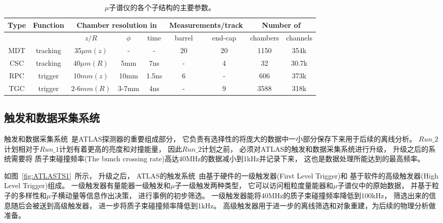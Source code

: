 \begin{table}[htbp]
      \caption{
$\mu$子谱仪的各个子结构的主要参数。    
      }
      \label{tab:ATLASTab2}
      \centering
      \begin{adjustbox}{width=\columnwidth,center}
      \begin{tabular}{|c|c|c|c|c|c|c|c|c|}
        \hline
         Type & Function  &   \multicolumn{3}{c|}{Chamber resolution in}   &   \multicolumn{2}{c}{Measurements/track}   &   \multicolumn{2}{|c|}{Number of}  \\
         \hline
         &   &  $z/R$ & $\phi$  & time  & barrel  & end-cap  &  chambers &   channels \\
         \hline
         MDT& tracking  & 35$\mu m(z)$ & -  &  - & 20  &  20 & 1150  &  354k \\
         \hline
         CSC& tracking  & 40$\mu m(R)$  &  5mm &  7ns &  - &  4 & 32  & 30.7k  \\
         \hline
         RPC& trigger  &  10$mm(z)$ & 10mm  & 1.5ns  &  6 & -  & 606  &  373k \\
         \hline
         TGC& trigger  & 2-6$mm(R)$  & 3-7mm  & 4ns  &  - & 9  & 3588  &  318k \\
         \hline
      \end{tabular}
      \end{adjustbox}
\end{table}

\subsection{触发和数据采集系统}
\label{sec:ATLASTDAS}

触发和数据采集系统~\cite{ATLASTDAQ}是ATLAS探测器的重要组成部分，
它负责有选择性的将庞大的数据中一小部分保存下来用于后续的离线分析。
$Run\_2$计划相对于$Run\_1$计划有着更高的亮度和对撞能量，
因此$Run\_2$计划之前，
必须对ATLAS的触发和数据采集系统进行升级，
升级之后的系统需要将
质子束碰撞频率(The bunch crossing rate)高达40MHz的数据减小到1kHz并记录下来，
这也是数据处理所能达到的最高频率。

如图~\ref{fig:ATLASTS1}~所示，
升级之后，
ATLAS的触发系统~\cite{ATLASRTS}由基于硬件的一级触发器(First Level Trigger)和
基于软件的高级触发器(High Level Trigger)组成。
一级触发器有量能器一级触发和$\mu$子一级触发两种类型，
它可以访问粗粒度量能器和$\mu$子谱仪中的原始数据，
并基于粒子的多样性和$\mu$子横动量等信息作出决策，
进行事例的初步筛选。
一级触发器能将40MHz的质子束碰撞频率降低到100kHz，
筛选出来的信息随后会被送到高级触发器，
进一步将质子束碰撞频率降低到1kHz。
高级触发器用于进一步的离线筛选和对象重建，为后续的物理分析做准备。

